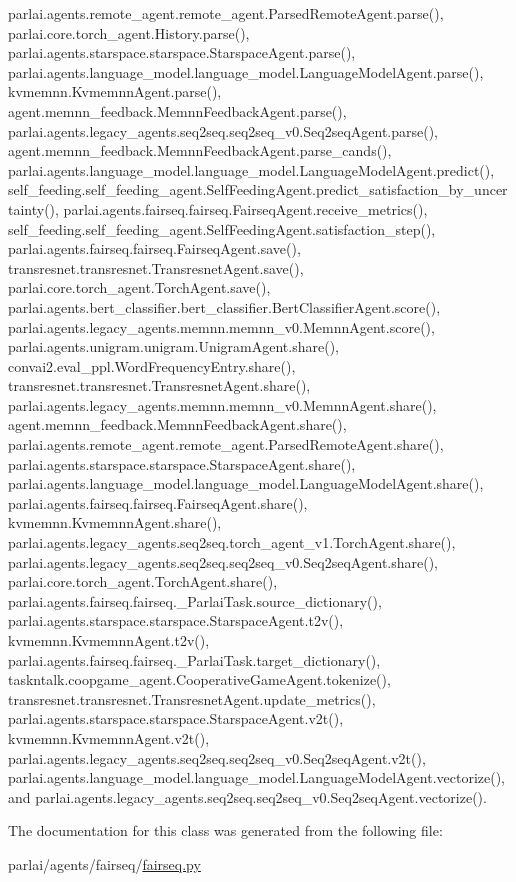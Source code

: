 parlai.\+agents.\+remote\+\_\+agent.\+remote\+\_\+agent.\+Parsed\+Remote\+Agent.\+parse(), parlai.\+core.\+torch\+\_\+agent.\+History.\+parse(), parlai.\+agents.\+starspace.\+starspace.\+Starspace\+Agent.\+parse(), parlai.\+agents.\+language\+\_\+model.\+language\+\_\+model.\+Language\+Model\+Agent.\+parse(), kvmemnn.\+Kvmemnn\+Agent.\+parse(), agent.\+memnn\+\_\+feedback.\+Memnn\+Feedback\+Agent.\+parse(), parlai.\+agents.\+legacy\+\_\+agents.\+seq2seq.\+seq2seq\+\_\+v0.\+Seq2seq\+Agent.\+parse(), agent.\+memnn\+\_\+feedback.\+Memnn\+Feedback\+Agent.\+parse\+\_\+cands(), parlai.\+agents.\+language\+\_\+model.\+language\+\_\+model.\+Language\+Model\+Agent.\+predict(), self\+\_\+feeding.\+self\+\_\+feeding\+\_\+agent.\+Self\+Feeding\+Agent.\+predict\+\_\+satisfaction\+\_\+by\+\_\+uncertainty(), parlai.\+agents.\+fairseq.\+fairseq.\+Fairseq\+Agent.\+receive\+\_\+metrics(), self\+\_\+feeding.\+self\+\_\+feeding\+\_\+agent.\+Self\+Feeding\+Agent.\+satisfaction\+\_\+step(), parlai.\+agents.\+fairseq.\+fairseq.\+Fairseq\+Agent.\+save(), transresnet.\+transresnet.\+Transresnet\+Agent.\+save(), parlai.\+core.\+torch\+\_\+agent.\+Torch\+Agent.\+save(), parlai.\+agents.\+bert\+\_\+classifier.\+bert\+\_\+classifier.\+Bert\+Classifier\+Agent.\+score(), parlai.\+agents.\+legacy\+\_\+agents.\+memnn.\+memnn\+\_\+v0.\+Memnn\+Agent.\+score(), parlai.\+agents.\+unigram.\+unigram.\+Unigram\+Agent.\+share(), convai2.\+eval\+\_\+ppl.\+Word\+Frequency\+Entry.\+share(), transresnet.\+transresnet.\+Transresnet\+Agent.\+share(), parlai.\+agents.\+legacy\+\_\+agents.\+memnn.\+memnn\+\_\+v0.\+Memnn\+Agent.\+share(), agent.\+memnn\+\_\+feedback.\+Memnn\+Feedback\+Agent.\+share(), parlai.\+agents.\+remote\+\_\+agent.\+remote\+\_\+agent.\+Parsed\+Remote\+Agent.\+share(), parlai.\+agents.\+starspace.\+starspace.\+Starspace\+Agent.\+share(), parlai.\+agents.\+language\+\_\+model.\+language\+\_\+model.\+Language\+Model\+Agent.\+share(), parlai.\+agents.\+fairseq.\+fairseq.\+Fairseq\+Agent.\+share(), kvmemnn.\+Kvmemnn\+Agent.\+share(), parlai.\+agents.\+legacy\+\_\+agents.\+seq2seq.\+torch\+\_\+agent\+\_\+v1.\+Torch\+Agent.\+share(), parlai.\+agents.\+legacy\+\_\+agents.\+seq2seq.\+seq2seq\+\_\+v0.\+Seq2seq\+Agent.\+share(), parlai.\+core.\+torch\+\_\+agent.\+Torch\+Agent.\+share(), parlai.\+agents.\+fairseq.\+fairseq.\+\_\+\+Parlai\+Task.\+source\+\_\+dictionary(), parlai.\+agents.\+starspace.\+starspace.\+Starspace\+Agent.\+t2v(), kvmemnn.\+Kvmemnn\+Agent.\+t2v(), parlai.\+agents.\+fairseq.\+fairseq.\+\_\+\+Parlai\+Task.\+target\+\_\+dictionary(), taskntalk.\+coopgame\+\_\+agent.\+Cooperative\+Game\+Agent.\+tokenize(), transresnet.\+transresnet.\+Transresnet\+Agent.\+update\+\_\+metrics(), parlai.\+agents.\+starspace.\+starspace.\+Starspace\+Agent.\+v2t(), kvmemnn.\+Kvmemnn\+Agent.\+v2t(), parlai.\+agents.\+legacy\+\_\+agents.\+seq2seq.\+seq2seq\+\_\+v0.\+Seq2seq\+Agent.\+v2t(), parlai.\+agents.\+language\+\_\+model.\+language\+\_\+model.\+Language\+Model\+Agent.\+vectorize(), and parlai.\+agents.\+legacy\+\_\+agents.\+seq2seq.\+seq2seq\+\_\+v0.\+Seq2seq\+Agent.\+vectorize().



The documentation for this class was generated from the following file\+:\begin{DoxyCompactItemize}
\item 
parlai/agents/fairseq/\hyperlink{fairseq_8py}{fairseq.\+py}\end{DoxyCompactItemize}

